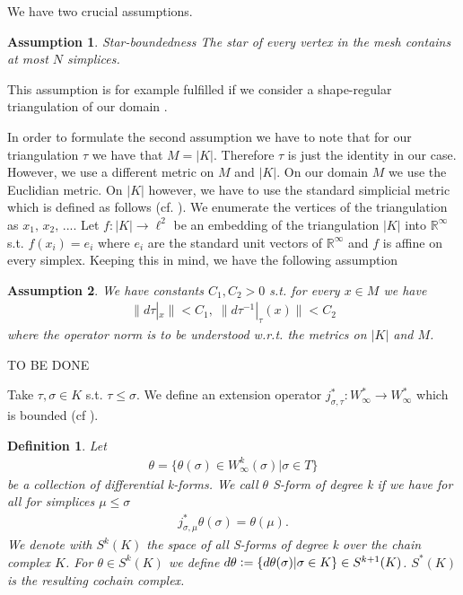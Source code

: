 \documentclass[12pt,a4paper]{article}
\newtheorem{assumption}{Assumption}
\newtheorem{definition}{Definition}
\newcommand{\real}{\mathbb{R}}
\begin{document}


We have two crucial assumptions.  

\begin{assumption}{Star-boundedness}
The star of every vertex in the mesh contains at most $N$ simplices.
\end{assumption}
This assumption is for example fulfilled if we consider a shape-regular
triangulation of our domain \cite{???}.

In order to formulate the second assumption we have to note that for our
triangulation $\tau$ we have that $M = |K|$. Therefore $\tau$ is just the 
identity in our case. However, we use a different metric on $M$ and $|K|$. 
On our domain $M$ we use the Euclidian metric. On $|K|$ however, we have to use
the standard simplicial metric which is defined as follows (cf. 
\cite[p.191]{goldshtein}). 
We enumerate the vertices of the triangulation as ${ x_1,\, x_2,\, ... }$.
Let $f: |K| \rightarrow \ell^2$ be an embedding 
of the triangulation $|K|$ into $\real^\infty$ s.t. $f(x_i) = e_i$ where $e_i$ 
are the standard unit vectors of $\real^\infty$ and $f$ is affine on every 
simplex. Keeping this in mind, we have the following assumption 

\begin{assumption}
    We have constants $C_1, C_2 > 0$ s.t. for every $x \in M$ we have
    \begin{align*}
    \lVert d\tau|_x \rVert < C_1, \; \lVert d\tau^{-1}|_\tau(x) \rVert < C_2
    \end{align*} 
    where the operator norm is to be understood w.r.t. the metrics on $|K|$ and
    $M$.
\end{assumption}
{\color{red} TO BE DONE}





Take $\tau, \sigma \in K$ s.t. $\tau \leq \sigma$.  We define an extension 
operator $j^*_{\sigma, \tau}:W^*_\infty \rightarrow W^*_\infty $ which is 
bounded (cf \cite[p.191]{goldshtein}). 
\begin{definition}
    Let 
    \begin{align*}
    \theta = \{ \theta(\sigma) \in W^k_\infty(\sigma) | \sigma \in T\}
    \end{align*}
    be a collection of differential k-forms. We call $\theta$ S-form of degree
    k if we have for all for simplices
    $\mu \leq \sigma$ 
    \begin{align*}
    j^*_{\sigma,\mu}\theta(\sigma) = \theta(\mu).
    \end{align*}
    We denote with $S^k(K)$ the space of all S-forms of degree k over the chain
    complex $K$. 
For $\theta \in S^k(K)$ we define $d\theta \vcentcolon= \{ d\theta(\sigma) | 
\sigma \in K \} \in S^{k+1}(K)$. $S^*(K)$ is the resulting cochain complex.
\end{definition}
\end{document}
